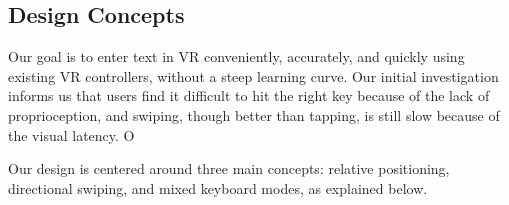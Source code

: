 \subsection{Design Concepts}

Our goal is to enter text in VR conveniently, accurately, and quickly using existing VR controllers, without a steep learning curve.  Our initial investigation informs us that users find it difficult to hit the right key because of the lack of proprioception, and swiping, though better than tapping, is still slow because of the visual latency.  O

Our design is centered around three main concepts: relative positioning, directional swiping, and mixed keyboard modes, as explained below. 

